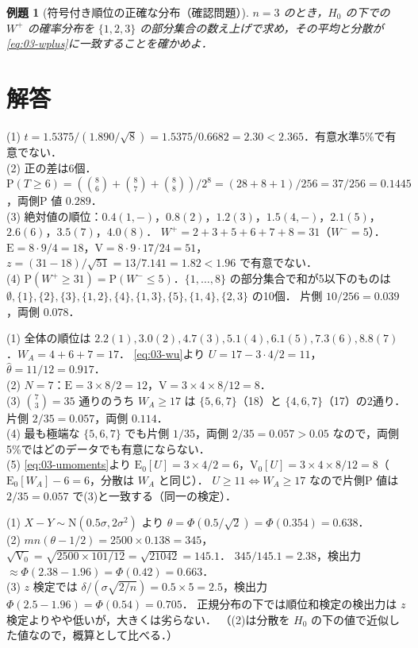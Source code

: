 \documentclass[a4paper,11pt,openany]{ltjsbook}
\newtheorem{reidai}{例題}[chapter]
\newenvironment{kaitou}[1]{%
  \par\medskip\noindent
  \begin{tcolorbox}[enhanced,breakable,colback=bkgray!3,colframe=bkgray!60,boxrule=0.4pt,
    left=4pt,right=4pt,top=2pt,bottom=2pt,arc=1pt,
    title={\cref{#1}の解答},fonttitle=\bfseries\small,coltitle=white,colbacktitle=bkgray!80]}%
  {\end{tcolorbox}\par}
\newcommand{\E}{\mathrm{E}}
\newcommand{\V}{\mathrm{V}}
\newcommand{\Prob}{\mathrm{P}}
\newcommand{\Normal}{\mathrm{N}}
\begin{document}
\begin{reidai}[符号付き順位の正確な分布（確認問題）]\label{reidai:03-4}
$n=3$ のとき，$H_0$ の下での $W^+$ の確率分布を $\{1,2,3\}$ の部分集合の数え上げで求め，その平均と分散が\cref{eq:03-wplus}に一致することを確かめよ．
\end{reidai}

\section{解答}\label{sec:03-sol}
\begin{kaitou}{reidai:03-1}
(1) $t=1.5375/(1.890/\sqrt8)=1.5375/0.6682=2.30<2.365$．有意水準5\%で有意でない．\\
(2) 正の差は6個．$\Prob(T\ge6)=(\binom86+\binom87+\binom88)/2^8=(28+8+1)/256=37/256=0.1445$，両側P 値 $0.289$．\\
(3) 絶対値の順位：$0.4(1,-)$，$0.8(2)$，$1.2(3)$，$1.5(4,-)$，$2.1(5)$，$2.6(6)$，$3.5(7)$，$4.0(8)$．
$W^+=2+3+5+6+7+8=31$（$W^-=5$）．$\E=8\cdot9/4=18$，$\V=8\cdot9\cdot17/24=51$，
$z=(31-18)/\sqrt{51}=13/7.141=1.82<1.96$ で有意でない．\\
(4) $\Prob(W^+\ge31)=\Prob(W^-\le5)$．$\{1,\dots,8\}$ の部分集合で和が5以下のものは
$\emptyset,\{1\},\{2\},\{3\},\{1,2\},\{4\},\{1,3\},\{5\},\{1,4\},\{2,3\}$ の10個．
片側 $10/256=0.039$，両側 $0.078$．
\end{kaitou}

\begin{kaitou}{reidai:03-2}
(1) 全体の順位は $2.2(1),3.0(2),4.7(3),5.1(4),6.1(5),7.3(6),8.8(7)$．$W_A=4+6+7=17$．
\cref{eq:03-wu}より $U=17-3\cdot4/2=11$，$\hat\theta=11/12=0.917$．\\
(2) $N=7$：$\E=3\times8/2=12$，$\V=3\times4\times8/12=8$．\\
(3) $\binom73=35$ 通りのうち $W_A\ge17$ は $\{5,6,7\}$（18）と $\{4,6,7\}$（17）の2通り．片側 $2/35=0.057$，両側 $0.114$．\\
(4) 最も極端な $\{5,6,7\}$ でも片側 $1/35$，両側 $2/35=0.057>0.05$ なので，両側5\%ではどのデータでも有意にならない．\\
(5) \cref{eq:03-umoments}より $\E_0[U]=3\times4/2=6$，$\V_0[U]=3\times4\times8/12=8$（$\E_0[W_A]-6=6$，分散は $W_A$ と同じ）．
$U\ge11\iff W_A\ge17$ なので片側P 値は $2/35=0.057$ で(3)と一致する（同一の検定）．
\end{kaitou}

\begin{kaitou}{reidai:03-3}
(1) $X-Y\sim\Normal(0.5\sigma,2\sigma^2)$ より $\theta=\Phi(0.5/\sqrt2)=\Phi(0.354)=0.638$．\\
(2) $mn(\theta-1/2)=2500\times0.138=345$，$\sqrt{\V_0}=\sqrt{2500\times101/12}=\sqrt{21042}=145.1$．
$345/145.1=2.38$，検出力 $\approx\Phi(2.38-1.96)=\Phi(0.42)=0.663$．\\
(3) $z$ 検定では $\delta/(\sigma\sqrt{2/n})=0.5\times5=2.5$，検出力 $\Phi(2.5-1.96)=\Phi(0.54)=0.705$．
正規分布の下では順位和検定の検出力は $z$ 検定よりやや低いが，大きくは劣らない．
（(2)は分散を $H_0$ の下の値で近似した値なので，概算として比べる．）
\end{kaitou}
\end{document}
